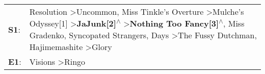 \begin{supertabular}{p{0.03\textwidth}p{0.92\textwidth}}
 \textbf{S1}:  &  Resolution\textsuperscript{} \textgreater \enspace Uncommon\textsuperscript{}, \enspace Miss Tinkle's Overture\textsuperscript{} \textgreater \enspace Mulche's Odyssey[1]\textsuperscript{} \textgreater \enspace \textbf{JaJunk[2]\textsuperscript{$\wedge$}} \textgreater \enspace \textbf{Nothing Too Fancy[3]\textsuperscript{$\wedge$}}, \enspace Miss Gradenko\textsuperscript{}, \enspace Syncopated Strangers\textsuperscript{},  Days\textsuperscript{} \textgreater \enspace The Fussy Dutchman\textsuperscript{}, \enspace Hajimemashite\textsuperscript{} \textgreater \enspace Glory\textsuperscript{}  \enspace  \\
 \textbf{E1}:  &                                                                                                                                                                                                                                                                                                                                                                                                                                                                                                                                                          Visions\textsuperscript{} \textgreater \enspace Ringo\textsuperscript{}  \enspace  \\
\end{supertabular}
